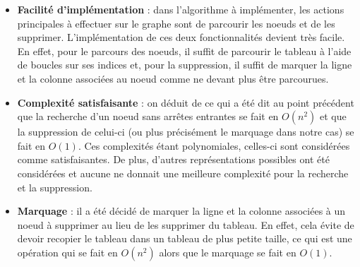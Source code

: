 \begin{itemize}
\item \textbf{Facilité d'implémentation} : dans l'algorithme à implémenter, les actions principales à effectuer sur le graphe sont de parcourir les noeuds et de les supprimer. L'implémentation de ces deux fonctionnalités devient très facile. En effet, pour le parcours des noeuds, il suffit de parcourir le tableau à l'aide de boucles sur ses indices et, pour la suppression, il suffit de marquer la ligne et la colonne associées au noeud comme ne devant plus être parcourues.

\item \textbf{Complexité satisfaisante} : on déduit de ce qui a été dit au point précédent que la recherche d'un noeud sans arrêtes entrantes se fait en $O(n^2)$ et que la suppression de celui-ci (ou plus précisément le marquage dans notre cas) se fait en $O(1)$. Ces complexités étant polynomiales, celles-ci sont considérées comme satisfaisantes. De plus, d'autres représentations possibles ont été considérées et aucune ne donnait une meilleure complexité pour la recherche et la suppression.

\item \textbf{Marquage} : il a été décidé de marquer la ligne et la colonne associées à un noeud à supprimer au lieu de les supprimer du tableau. En effet, cela évite de devoir recopier le tableau dans un tableau de plus petite taille, ce qui est une opération qui se fait en $O(n^2)$ alors que le marquage se fait en $O(1)$.
\end{itemize}

